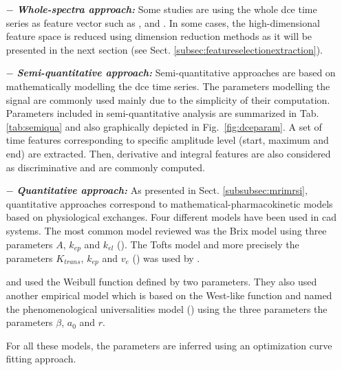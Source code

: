 \begin{enumerate}[leftmargin=*]

\item[$-$] \textbf{\textit{Whole-spectra approach:}} Some studies are using the whole \ac{dce} time series as feature vector such as \cite{Ampeliotis2007,Ampeliotis2008}, \cite{Tiwari2012} and \cite{Viswanath2008a,Viswanath2008}. In some cases, the high-dimensional feature space is reduced using dimension reduction methods as it will be presented in the next section (see Sect. \ref{subsec:featureselectionextraction}).

\item[$-$] \textbf{\textit{Semi-quantitative approach:}} Semi-quantitative approaches are based on mathematically modelling the \ac{dce} time series. The parameters modelling the signal are commonly used mainly due to the simplicity of their computation. Parameters included in semi-quantitative analysis are summarized in Tab. \ref{tab:semiqua} and also graphically depicted in Fig.~\ref{fig:dceparam}. A set of time features corresponding to specific amplitude level (start, maximum and end) are extracted. Then, derivative and integral features are also considered as discriminative and are commonly computed.

\item[$-$] \textbf{\textit{Quantitative approach:}} As presented in Sect. \ref{subsubsec:mrimrsi}, quantitative approaches correspond to mathematical-pharmacokinetic models based on physiological exchanges. Four different models have been used in \ac{cad} systems. The most common model reviewed was the Brix model using three parameters $A$, $k_{ep}$ and $k_{el}$ (\cite{Artan2009,Artan2010,Sung2011,Liu2009,Ozer2009,Ozer2010}). The Tofts model and more precisely the parameters $K_{trans}$, $k_{ep}$ and $v_e$ (\cite{Tofts1997}) was used by \cite{Langer2009,Litjens2011,Litjens2012,Litjens2014,Giannini2013,Niaf2011,Niaf2012,Mazzetti2011}.

  \cite{Mazzetti2011} and \cite{Giannini2013} used the Weibull function defined by two parameters. They also used another empirical model which is based on the West-like function and named the phenomenological universalities model (\cite{Castorina2006}) using the three parameters the parameters $\beta$, $a_0$ and $r$.

  For all these models, the parameters are inferred using an optimization curve fitting approach.

\end{enumerate}

